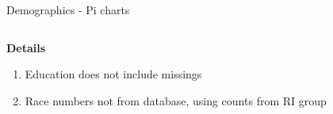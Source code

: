 \begin{frame}{Demographics - Pi charts}
\begin{columns}[c]
    \end{columns}

    \textbf{Details}
    \begin{enumerate}
        \item Education does not include missings
        \item Race numbers not from database, using counts from RI group
    \end{enumerate}

\end{frame}


